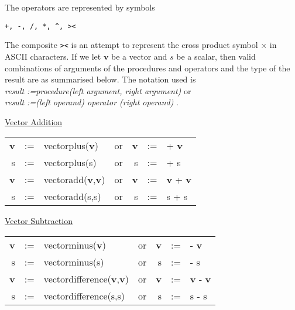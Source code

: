 The operators are represented by symbols 
\hypertarget{reserved:vectorcross}{}
\begin{verbatim}  
+, -, /, *, ^, ><
\end{verbatim}
The composite \texttt{><} is an
attempt to represent the cross product symbol 
$\times$ in ASCII characters.
If we let $\mathbf{v}$ be a vector and $s$ be a scalar, then
valid combinations of arguments of the 
procedures and operators and the type of the result 
are as summarised below.  The notation used is\\
\emph{result :=procedure(left argument, right argument) } or\\
\emph{result :=(left operand) operator (right operand) } . 

\underline{Vector Addition} \\
  
\begin{tabular}{rclcrcl}
\textbf{v} &:=& vectorplus(\textbf{v})  &{\rm or}& \textbf{v} &:=&  +  \textbf{v} \\
     s  &:=& vectorplus(s)  &{\rm or} &      s  &:=&  +       s  \\
\textbf{v} &:=& vectoradd(\textbf{v},\textbf{v})  &{\rm or }& \textbf{v} &:=&  
\textbf{v} +  \textbf{v} \\
     s  &:=& vectoradd(s,s)  &{\rm or }&      s  &:=&  s + s \\
\end{tabular}

\underline{Vector Subtraction} \\
  
\begin{tabular}{rclcrcl}
\textbf{v} &:=& vectorminus(\textbf{v})  &{\rm or}&
 \textbf{v} &:=&  -  \textbf{v} \\
 s  &:=& vectorminus(s)  &{\rm or} &      s  &:=&  -       s  \\
\textbf{v} &:=& vectordifference(\textbf{v},\textbf{v})  &{\rm or }& \textbf{v} &:=&
  \textbf{v} -  \textbf{v} \\
 s  &:=& vectordifference(s,s)  &{\rm or }&      s  &:=&  s - s \\
\end{tabular}

